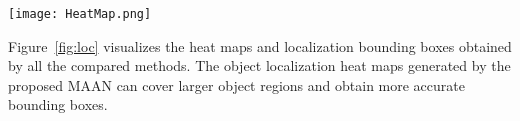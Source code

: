 \documentclass{article} \usepackage{iclr2019_conference,times}
\begin{document}
\begin{figure*}[t!]
\centering
\texttt{[image: HeatMap.png]}\caption{Comparison with the baseline methods. The proposed MAAN can locate larger object regions to improve localization performance (ground-truth bounding boxes are in red and the predicted ones are in green).}
\label{fig:loc}
\end{figure*}



Figure~\ref{fig:loc} visualizes the heat maps and localization bounding boxes obtained by all the compared methods. The object localization heat maps generated by the proposed MAAN can cover larger object regions and obtain more accurate bounding boxes. 















































 
\end{document}
